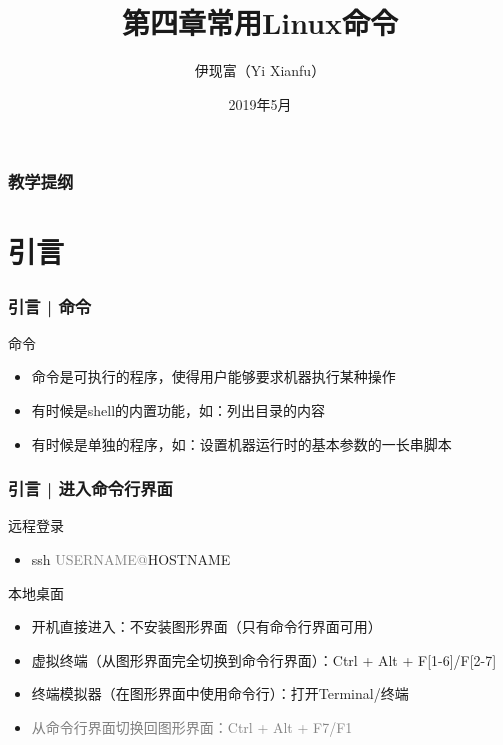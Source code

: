 



\title[常用Linux命令]{第四章\quad 常用Linux命令}
\author[Yixf]{伊现富（Yi Xianfu）}
\date{2019年5月}


\begin{frame}
  \titlepage
\end{frame}

\begin{frame}[plain,label=current]
  \frametitle{教学提纲}
  \setcounter{tocdepth}{3}
  \begin{multicols}{2}
    \tableofcontents
  \end{multicols}
\end{frame}


\section{引言}
\begin{frame}
  \frametitle{引言 | 命令}
  \begin{block}{命令}
    \begin{itemize}
      \item 命令是可执行的程序，使得用户能够要求机器执行某种操作
      \item 有时候是shell的内置功能，如：列出目录的内容
      \item 有时候是单独的程序，如：设置机器运行时的基本参数的一长串脚本
    \end{itemize}
  \end{block}
\end{frame}

\begin{frame}
  \frametitle{引言 | \alert{进入命令行界面}}
  \begin{block}{远程登录}
    \begin{itemize}
      \item ssh \textcolor{gray}{USERNAME@}HOSTNAME
    \end{itemize}
  \end{block}
  \pause
  \begin{block}{本地桌面}
    \begin{itemize}
      \item 开机直接进入：不安装图形界面（只有命令行界面可用）
      \item 虚拟终端（从图形界面完全切换到命令行界面）：Ctrl + Alt + F[1-6]/F[2-7]
      \item 终端模拟器（在图形界面中使用命令行）：打开Terminal/终端
      \item \textcolor{gray}{从命令行界面切换回图形界面：Ctrl + Alt + F7/F1}
    \end{itemize}
  \end{block}
\end{frame}


